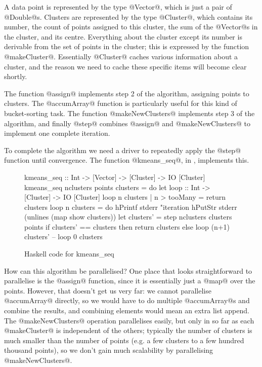 A data point is represented by the type @Vector@, which is just a pair
of @Double@s.  Clusters are represented by the type @Cluster@, which
contains its number, the count of points assigned to this cluster, the
sum of the @Vector@s in the cluster, and its centre.  Everything about
the cluster except its number is derivable from the set of points in
the cluster; this is expressed by the function @makeCluster@.
Essentially @Cluster@ caches various information about a cluster, and
the reason we need to cache these specific items will become clear
shortly.

The function @assign@ implements step 2 of the algorithm, assigning
points to clusters.  The @accumArray@ function is particularly useful
for this kind of bucket-sorting task.  The function @makeNewClusters@
implements step 3 of the algorithm, and finally @step@ combines
@assign@ and @makeNewClusters@ to implement one complete iteration.

To complete the algorithm we need a driver to repeatedly apply the @step@
function until convergence. The function @kmeans_seq@, in
, implements this.

\begin{figure}
\begin{haskell}
kmeans_seq :: Int -> [Vector] -> [Cluster] -> IO [Cluster]
kmeans_seq nclusters points clusters = do
  let
      loop :: Int -> [Cluster] -> IO [Cluster]
      loop n clusters | n > tooMany = return clusters
      loop n clusters = do
        hPrintf stderr "iteration %
        hPutStr stderr (unlines (map show clusters))
        let clusters' = step nclusters clusters points
        if clusters' == clusters
           then return clusters
           else loop (n+1) clusters'
  --
  loop 0 clusters
\end{haskell}
\caption{Haskell code for kmeans\_seq}
\label{fig:kmeans_seq}
\end{figure}

How can this algorithm be parallelised?  One place that looks
straightforward to parallelise is the @assign@ function, since it is
essentially just a @map@ over the points.  However, that doesn't get
us very far: we cannot parallelise @accumArray@ directly, so we would
have to do multiple @accumArray@s and combine the results, and
combining elements would mean an extra list append.  The
@makeNewClusters@ operation parallelises easily, but only in so far as
each @makeCluster@ is independent of the others; typically the number
of clusters is much smaller than the number of points (e.g. a few
clusters to a few hundred thousand points), so we don't gain much
scalability by parallelising @makeNewClusters@.

